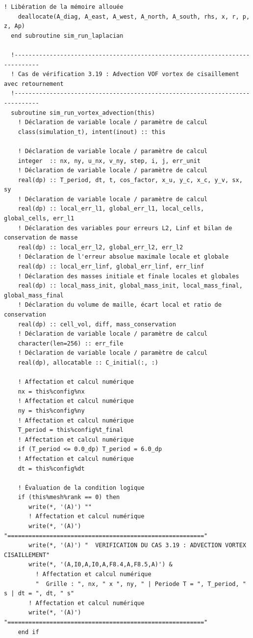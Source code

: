 \documentclass[10pt,a4paper,oneside]{book}
\begin{document}
\begin{lstlisting}[language={[95]Fortran}]
    ! Libération de la mémoire allouée
    deallocate(A_diag, A_east, A_west, A_north, A_south, rhs, x, r, p, z, Ap)
  end subroutine sim_run_laplacian

  !-----------------------------------------------------------------------------
  ! Cas de vérification 3.19 : Advection VOF vortex de cisaillement avec retournement
  !-----------------------------------------------------------------------------
  subroutine sim_run_vortex_advection(this)
    ! Déclaration de variable locale / paramètre de calcul
    class(simulation_t), intent(inout) :: this

    ! Déclaration de variable locale / paramètre de calcul
    integer  :: nx, ny, u_nx, v_ny, step, i, j, err_unit
    ! Déclaration de variable locale / paramètre de calcul
    real(dp) :: T_period, dt, t, cos_factor, x_u, y_c, x_c, y_v, sx, sy
    ! Déclaration de variable locale / paramètre de calcul
    real(dp) :: local_err_l1, global_err_l1, local_cells, global_cells, err_l1
    ! Déclaration des variables pour erreurs L2, Linf et bilan de conservation de masse
    real(dp) :: local_err_l2, global_err_l2, err_l2
    ! Déclaration de l'erreur absolue maximale locale et globale
    real(dp) :: local_err_linf, global_err_linf, err_linf
    ! Déclaration des masses initiale et finale locales et globales
    real(dp) :: local_mass_init, global_mass_init, local_mass_final, global_mass_final
    ! Déclaration du volume de maille, écart local et ratio de conservation
    real(dp) :: cell_vol, diff, mass_conservation
    ! Déclaration de variable locale / paramètre de calcul
    character(len=256) :: err_file
    ! Déclaration de variable locale / paramètre de calcul
    real(dp), allocatable :: C_initial(:, :)

    ! Affectation et calcul numérique
    nx = this%config%nx
    ! Affectation et calcul numérique
    ny = this%config%ny
    ! Affectation et calcul numérique
    T_period = this%config%t_final
    ! Affectation et calcul numérique
    if (T_period <= 0.0_dp) T_period = 6.0_dp
    ! Affectation et calcul numérique
    dt = this%config%dt

    ! Évaluation de la condition logique
    if (this%mesh%rank == 0) then
       write(*, '(A)') ""
       ! Affectation et calcul numérique
       write(*, '(A)') "========================================================"
       write(*, '(A)') "  VERIFICATION DU CAS 3.19 : ADVECTION VORTEX CISAILLEMENT"
       write(*, '(A,I0,A,I0,A,F8.4,A,F8.5,A)') &
         ! Affectation et calcul numérique
         "  Grille : ", nx, " x ", ny, " | Periode T = ", T_period, " s | dt = ", dt, " s"
       ! Affectation et calcul numérique
       write(*, '(A)') "========================================================"
    end if


\end{lstlisting}
\end{document}
